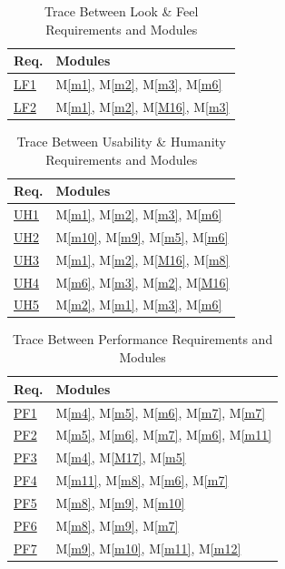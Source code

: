 \documentclass[12pt, titlepage]{article}
\newcommand{\mref}[1]{M\ref{#1}}
\begin{document}
\begin{table}[H]
\centering
\begin{tabular}{p{} p{}}
\toprule
\textbf{Req.} & \textbf{Modules}\\
\midrule
\hyperref[req:AR1]{LF1} & \mref{m1}, \mref{m2}, \mref{m3}, \mref{m6}\\
\hyperref[req:SR1]{LF2} & \mref{m1}, \mref{m2}, \mref{M16}, \mref{m3}\\
\bottomrule
\end{tabular}
\caption{Trace Between Look \& Feel Requirements and Modules}
\label{TblRTLF}
\end{table}

\begin{table}[H]
\centering
\begin{tabular}{p{} p{}}
\toprule
\textbf{Req.} & \textbf{Modules}\\
\midrule
\hyperref[req:EU1]{UH1} & \mref{m1}, \mref{m2}, \mref{m3}, \mref{m6}\\
\hyperref[req:PI1]{UH2} & \mref{m10}, \mref{m9}, \mref{m5}, \mref{m6}\\
\hyperref[req:LR1]{UH3} & \mref{m1}, \mref{m2}, \mref{M16}, \mref{m8}\\
\hyperref[req:UP1]{UH4} & \mref{m6}, \mref{m3}, \mref{m2}, \mref{M16}\\
\hyperref[req:AC1]{UH5} & \mref{m2}, \mref{m1}, \mref{m3}, \mref{m6}\\
\bottomrule
\end{tabular}
\caption{Trace Between Usability \& Humanity Requirements and Modules}
\label{TblRTUsabilityHumanity}
\end{table}

\begin{table}[H]
\centering
\begin{tabular}{p{} p{}}
\toprule
\textbf{Req.} & \textbf{Modules}\\
\midrule
\hyperref[req:PR1]{PF1} & \mref{m4}, \mref{m5}, \mref{m6}, \mref{m7}, \mref{m7}\\
\hyperref[req:PR2]{PF2} & \mref{m5}, \mref{m6}, \mref{m7}, \mref{m6}, \mref{m11}\\
\hyperref[req:PR3]{PF3} & \mref{m4}, \mref{M17}, \mref{m5}\\
\hyperref[req:PR4]{PF4} & \mref{m11}, \mref{m8}, \mref{m6}, \mref{m7}\\
\hyperref[req:PR5]{PF5} & \mref{m8}, \mref{m9}, \mref{m10}\\
\hyperref[req:PR6]{PF6} & \mref{m8}, \mref{m9}, \mref{m7}\\
\hyperref[req:PR7]{PF7} & \mref{m9}, \mref{m10}, \mref{m11}, \mref{m12}\\
\bottomrule
\end{tabular}
\caption{Trace Between Performance Requirements and Modules}
\label{TblRTPerformance}
\end{table}
\end{document}
